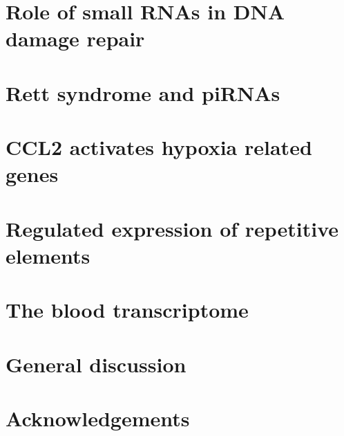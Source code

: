 \documentclass[10pt,a4paper]{report}
\begin{document}
\chapter{Role of small RNAs in DNA damage repair}\label{ddrna}



\chapter{Rett syndrome and piRNAs}\label{pirna}



\chapter{CCL2 activates hypoxia related genes}\label{ccl2}



\chapter{Regulated expression of repetitive elements}\label{repeat}


\chapter{The blood transcriptome}\label{blood}


%

\chapter{General discussion}
%

\chapter*{Acknowledgements}




\end{document}
